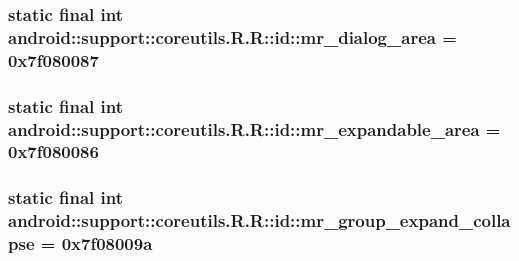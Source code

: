 \hypertarget{classandroid_1_1support_1_1coreutils_1_1_r_1_1id_7dc56e9884a1f4253289847325e50510}{
\subsubsection[{mr\_\-dialog\_\-area}]{\setlength{\rightskip}{0pt plus 5cm}static final int android::support::coreutils.R.R::id::mr\_\-dialog\_\-area = 0x7f080087}}
\label{classandroid_1_1support_1_1coreutils_1_1_r_1_1id_7dc56e9884a1f4253289847325e50510}


\hypertarget{classandroid_1_1support_1_1coreutils_1_1_r_1_1id_d5d95833d41f535a9c6dc0f1a64970e6}{
\subsubsection[{mr\_\-expandable\_\-area}]{\setlength{\rightskip}{0pt plus 5cm}static final int android::support::coreutils.R.R::id::mr\_\-expandable\_\-area = 0x7f080086}}
\label{classandroid_1_1support_1_1coreutils_1_1_r_1_1id_d5d95833d41f535a9c6dc0f1a64970e6}


\hypertarget{classandroid_1_1support_1_1coreutils_1_1_r_1_1id_1731828e4e0ba5dc5f26dc7963265573}{
\subsubsection[{mr\_\-group\_\-expand\_\-collapse}]{\setlength{\rightskip}{0pt plus 5cm}static final int android::support::coreutils.R.R::id::mr\_\-group\_\-expand\_\-collapse = 0x7f08009a}}
\label{classandroid_1_1support_1_1coreutils_1_1_r_1_1id_1731828e4e0ba5dc5f26dc7963265573}


